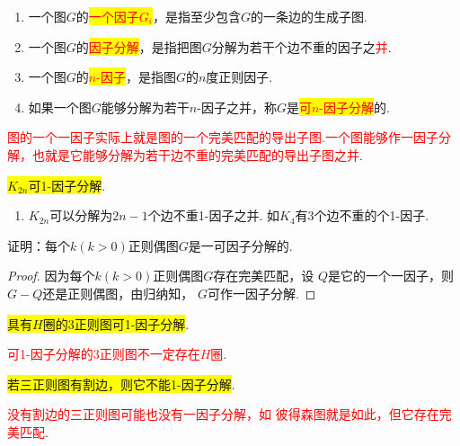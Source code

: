 \begin{definition}
	\begin{enumerate}
		\item 一个图$G$的\colorbox{yellow}{\textcolor{red}{一个因子$G_i$}}，是指至少包含$G$的一条边的生成子图.
		\item 一个图$G$的\colorbox{yellow}{\textcolor{red}{因子分解}}，是指把图$G$分解为若干个边不重的因子之\textcolor{red}{并}.
		\item 一个图$G$的\colorbox{yellow}{\textcolor{red}{$n$-因子}}，是指图$G$的$n$度正则因子.
		\item 如果一个图$G$能够分解为若干$n$-因子之并，称$G$是\colorbox{yellow}{\textcolor{red}{可$n$-因子分解}}的.
	\end{enumerate}
\end{definition}
\begin{note}
	\textcolor{red}{图的一个一因子实际上就是图的一个完美匹配的导出子图.一个图能够作一因子分解，也就是它能够分解为若干边不重的完美匹配的导出子图之并}.
\end{note}

\begin{theorem}
	\colorbox{yellow}{$K_{2n}$可1-因子分解}.
\end{theorem}
\begin{note}
	
	\begin{enumerate}
		\item $K_{2n}$可以分解为$2n-1$个边不重1-因子之并. 如$K_4$有$3$个边不重的个1-因子.
	\end{enumerate}
\end{note}
\begin{example}
	证明：每个$k (k>0)$正则偶图$G$是一可因子分解的.
\end{example}
\begin{proof}
	因为每个$k (k>0)$正则偶图$G$存在完美匹配，设
	$Q$是它的一个一因子，则$G-Q$还是正则偶图，由归纳知，
	$G$可作一因子分解.
\end{proof}

\begin{theorem}
	\colorbox{yellow}{具有$H$圈的3正则图可1-因子分解}.
\end{theorem}
\begin{note}
	\textcolor{red}{可1-因子分解的3正则图不一定存在$H$圈}.
\end{note}


\begin{theorem}
	\colorbox{yellow}{若三正则图有割边，则它不能1-因子分解}.
\end{theorem}
\begin{note}
	\textcolor{red}{没有割边的三正则图可能也没有一因子分解，如
		彼得森图就是如此，但它存在完美匹配}.
\end{note}

